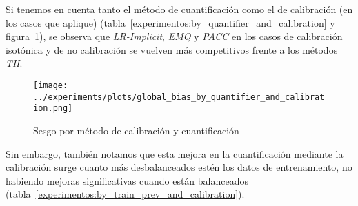 Si tenemos en cuenta tanto el método de cuantificación como el de calibración
(en los casos que aplique)
(tabla~\ref{experimentos:by_quantifier_and_calibration} y
figura~\ref{fig:global_bias_by_quantifier_and_calibration}), se observa que {\it
LR-Implicit}, {\it EMQ} y {\it PACC} en los casos de calibración isotónica y de
no calibración se vuelven más competitivos frente a los métodos {\it TH}.

\begin{figure}[H]
    \centering
    \centerline{\texttt{[image: ../experiments/plots/global\_bias\_by\_quantifier\_and\_calibration.png]}}
    \caption{Sesgo por método de calibración y
    cuantificación}\label{fig:global_bias_by_quantifier_and_calibration}
\end{figure}

Sin embargo, también notamos que esta mejora en la cuantificación mediante la
calibración surge cuanto más desbalanceados estén los datos de entrenamiento, no
habiendo mejoras significativas cuando están balanceados
(tabla~\ref{experimentos:by_train_prev_and_calibration}).

